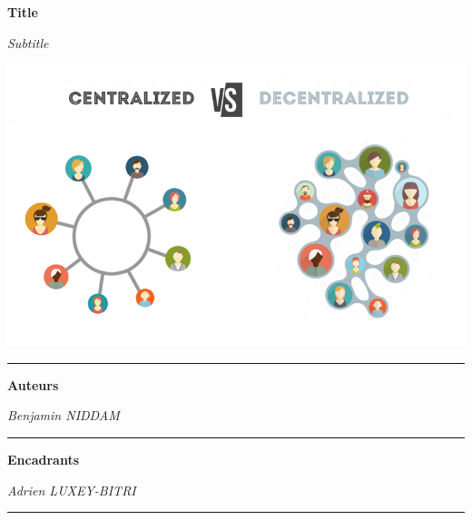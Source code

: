 \begin{titlepage}
    \begin{center}
        \vspace*{\fill}

        \textbf{\huge{Title}}\\

        \vspace{0.5cm}

        \textsl{\large{Subtitle}}\\

        \vspace{2.5cm}

        \includegraphics[scale=0.5]{./assets/logo.png}

        \vspace{2.5cm}

        \rule{\linewidth}{0.15mm}
        \textbf{Auteurs}

        \vspace{0.5cm}

        \small{\textit{Benjamin NIDDAM}} \\
        \rule{\linewidth}{0.15mm}
        \textbf{Encadrants}

        \vspace{0.5cm}

        \small{\textit{Adrien LUXEY-BITRI}} \\
        \rule{\linewidth}{0.15mm}

        \vspace{2.5cm}

        \vfill
        \date{09 juin 2023}
    \end{center}
\end{titlepage}